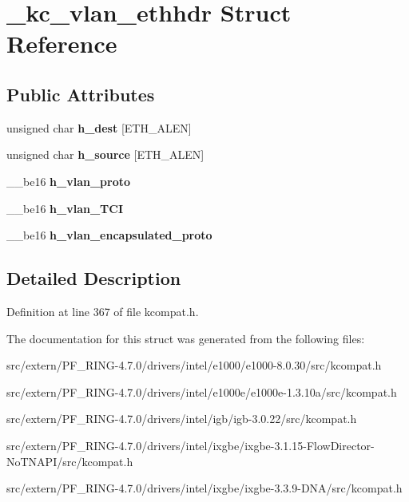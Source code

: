 \hypertarget{struct__kc__vlan__ethhdr}{
\section{\_\-kc\_\-vlan\_\-ethhdr Struct Reference}
\label{struct__kc__vlan__ethhdr}
}
\subsection*{Public Attributes}
\begin{DoxyCompactItemize}
\item 
\hypertarget{struct__kc__vlan__ethhdr_a02ed931ba2e15931a0af00b9e013d8e8}{
unsigned char {\bfseries h\_\-dest} \mbox{[}ETH\_\-ALEN\mbox{]}}
\label{struct__kc__vlan__ethhdr_a02ed931ba2e15931a0af00b9e013d8e8}

\item 
\hypertarget{struct__kc__vlan__ethhdr_a1d9ee094b3e84a2bf3ae69883d1f9908}{
unsigned char {\bfseries h\_\-source} \mbox{[}ETH\_\-ALEN\mbox{]}}
\label{struct__kc__vlan__ethhdr_a1d9ee094b3e84a2bf3ae69883d1f9908}

\item 
\hypertarget{struct__kc__vlan__ethhdr_ad4d210b64d433ddecbc23d1570ba73f7}{
\_\-\_\-be16 {\bfseries h\_\-vlan\_\-proto}}
\label{struct__kc__vlan__ethhdr_ad4d210b64d433ddecbc23d1570ba73f7}

\item 
\hypertarget{struct__kc__vlan__ethhdr_a2fbaccc0a20269eb81d6b7db09a7f7e6}{
\_\-\_\-be16 {\bfseries h\_\-vlan\_\-TCI}}
\label{struct__kc__vlan__ethhdr_a2fbaccc0a20269eb81d6b7db09a7f7e6}

\item 
\hypertarget{struct__kc__vlan__ethhdr_ab161cdb9ee82a10941a2de5eeae6e6bd}{
\_\-\_\-be16 {\bfseries h\_\-vlan\_\-encapsulated\_\-proto}}
\label{struct__kc__vlan__ethhdr_ab161cdb9ee82a10941a2de5eeae6e6bd}

\end{DoxyCompactItemize}


\subsection{Detailed Description}


Definition at line 367 of file kcompat.h.



The documentation for this struct was generated from the following files:\begin{DoxyCompactItemize}
\item 
src/extern/PF\_\-RING-\/4.7.0/drivers/intel/e1000/e1000-\/8.0.30/src/kcompat.h\item 
src/extern/PF\_\-RING-\/4.7.0/drivers/intel/e1000e/e1000e-\/1.3.10a/src/kcompat.h\item 
src/extern/PF\_\-RING-\/4.7.0/drivers/intel/igb/igb-\/3.0.22/src/kcompat.h\item 
src/extern/PF\_\-RING-\/4.7.0/drivers/intel/ixgbe/ixgbe-\/3.1.15-\/FlowDirector-\/NoTNAPI/src/kcompat.h\item 
src/extern/PF\_\-RING-\/4.7.0/drivers/intel/ixgbe/ixgbe-\/3.3.9-\/DNA/src/kcompat.h\end{DoxyCompactItemize}
